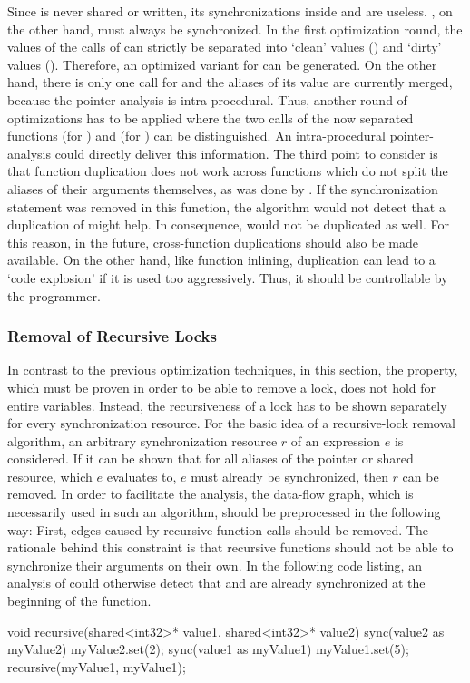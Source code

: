 Since  is never shared or written, its synchronizations inside  and  are useless. , on the other hand, must always be synchronized. In the first optimization round, the values of the calls of  can strictly be separated into `clean' values () and `dirty' values (). Therefore, an optimized variant for  can be generated. On the other hand, there is only one call for  and the aliases of its value are currently merged, because the pointer-analysis is intra-procedural. Thus, another round of optimizations has to be applied where the two calls of the now separated functions  (for ) and  (for ) can be distinguished. An intra-procedural pointer-analysis could directly deliver this information. The third point to consider is that function duplication does not work across functions which do not split the aliases of their arguments themselves, as was done by . If the synchronization statement was removed in this function, the algorithm would not detect that a duplication of  might help. In consequence,  would not be duplicated as well. For this reason, in the future, cross-function duplications should also be made available. On the other hand, like function inlining, duplication can lead to a `code explosion' if it is used too aggressively. Thus, it should be controllable by the programmer.

\subsubsection{Removal of Recursive Locks}
In contrast to the previous optimization techniques, in this section, the property, which must be proven in order to be able to remove a lock, does not hold for entire variables. Instead, the recursiveness of a lock has to be shown separately for every synchronization resource. For the basic idea of a recursive-lock removal algorithm, an arbitrary synchronization resource $r$ of an expression $e$ is considered. If it can be shown that for all aliases of the pointer or shared resource, which $e$ evaluates to, $e$ must already be synchronized, then $r$ can be removed. In order to facilitate the analysis, the data-flow graph, which is necessarily used in such an algorithm, should be preprocessed in the following way: First, edges caused by recursive function calls should be removed. The rationale behind this constraint is that recursive functions should not be able to synchronize their arguments on their own. In the following code listing, an analysis of  could otherwise  detect that  and  are already synchronized at the beginning of the function.
\begin{ccode}
void recursive(shared<int32>* value1, shared<int32>* value2) {
  sync(value2 as myValue2) {
    myValue2.set(2);
  }
  sync(value1 as myValue1) {
    myValue1.set(5);
    recursive(myValue1, myValue1);
  }
}
\end{ccode}

